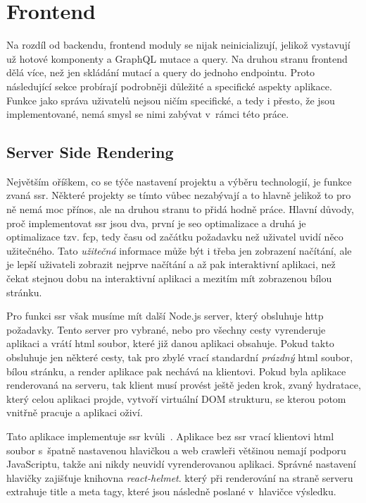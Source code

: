 \section{Frontend}
\label{sc:frontend}
Na rozdíl od backendu, frontend moduly se nijak neinicializují, jelikož vystavují už hotové komponenty a GraphQL mutace a query. Na druhou stranu frontend dělá více, než jen skládání mutací a query do jednoho endpointu. Proto následující sekce probírají podrobněji důležité a specifické aspekty aplikace. Funkce jako správa uživatelů nejsou ničím specifické, a tedy i přesto, že jsou implementované, nemá smysl se nimi zabývat v~rámci této práce.

\subsection{Server Side Rendering}
\label{ss:ssr}
Největším oříškem, co se týče nastavení projektu a výběru technologií, je funkce zvaná \acrfull{ssr}. Některé projekty se tímto vůbec nezabývají a to hlavně jelikož to pro ně nemá moc přínos, ale na druhou stranu to přidá hodně práce. Hlavní důvody, proč implementovat \acrshort{ssr} jsou dva, první je \acrshort{seo} optimalizace a druhá je optimalizace tzv. \acrfull{fcp}, tedy času od začátku požadavku než uživatel uvidí něco užitečného. Tato \emph{užitečná} informace může být i třeba jen zobrazení načítání, ale je lepší uživateli zobrazit nejprve načítání a až pak interaktivní aplikaci, než čekat stejnou dobu na interaktivní aplikaci a mezitím mít zobrazenou bílou stránku.

Pro funkci \acrshort{ssr} však musíme mít další Node.js server, který obsluhuje http požadavky. Tento server pro vybrané, nebo pro všechny cesty vyrenderuje aplikaci a vrátí html soubor, které již danou aplikaci obsahuje. Pokud takto obsluhuje jen některé cesty, tak pro zbylé vrací standardní \emph{prázdný} html soubor, bílou stránku, a render aplikace pak nechává na klientovi. Pokud byla aplikace renderovaná na serveru, tak klient musí provést ještě jeden krok, zvaný hydratace, který celou aplikaci projde, vytvoří virtuální DOM strukturu, se kterou potom vnitřně pracuje a aplikaci oživí.

Tato aplikace implementuje \acrshort{ssr} kvůli~. Aplikace bez \acrshort{ssr} vrací klientovi html soubor s~špatně nastavenou hlavičkou a web crawleři většinou nemají podporu JavaScriptu, takže ani nikdy neuvidí vyrenderovanou aplikaci. Správné nastavení hlavičky zajišťuje knihovna \emph{react-helmet}. který při renderování na straně serveru extrahuje title a meta tagy, které jsou následně poslané v~hlavičce výsledku.

